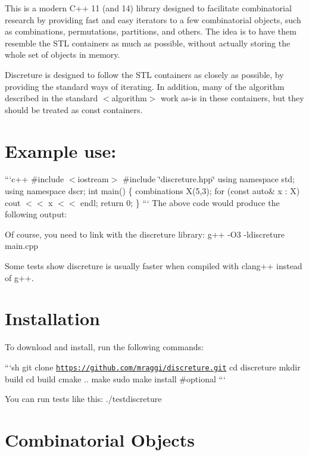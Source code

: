 This is a modern C++ 11 (and 14) library designed to facilitate combinatorial research by providing fast and easy iterators to a few combinatorial objects, such as combinations, permutations, partitions, and others. The idea is to have them resemble the S\-T\-L containers as much as possible, without actually storing the whole set of objects in memory.

Discreture is designed to follow the S\-T\-L containers as closely as possible, by providing the standard ways of iterating. In addition, many of the algorithm described in the standard $<$algorithm$>$ work as-\/is in these containers, but they should be treated as const containers.

\section*{Example use\-:}

```c++ \#include $<$iostream$>$ \#include \char`\"{}discreture.\-hpp\char`\"{} using namespace std; using namespace dscr; int main() \{ combinations X(5,3); for (const auto\& x \-: X) cout $<$$<$ x $<$$<$ endl; return 0; \} ``` The above code would produce the following output\-: \begin{DoxyVerb}[ 0 1 2 ]
[ 0 1 3 ]
[ 0 2 3 ]
[ 1 2 3 ]
[ 0 1 4 ]
[ 0 2 4 ]
[ 1 2 4 ]
[ 0 3 4 ]
[ 1 3 4 ]
[ 2 3 4 ]
\end{DoxyVerb}


Of course, you need to link with the discreture library\-: g++ -\/\-O3 -\/ldiscreture main.\-cpp

Some tests show discreture is usually faster when compiled with clang++ instead of g++.

\section*{Installation}

To download and install, run the following commands\-:

```sh git clone \href{https://github.com/mraggi/discreture.git}{\tt https\-://github.\-com/mraggi/discreture.\-git} cd discreture mkdir build cd build cmake .. make sudo make install \#optional ```

You can run tests like this\-: {\ttfamily ./testdiscreture}

\section*{Combinatorial Objects}

